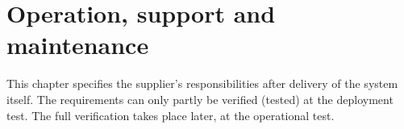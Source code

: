 \documentclass[Main]{subfiles}
\begin{document}
\chapter{Operation, support and maintenance}

This chapter specifies the supplier's responsibilities after delivery of the system itself. 
The requirements can only partly be verified (tested) at the deployment test. 
The full verification takes place later, at the operational test.



%
%

\end{document}
